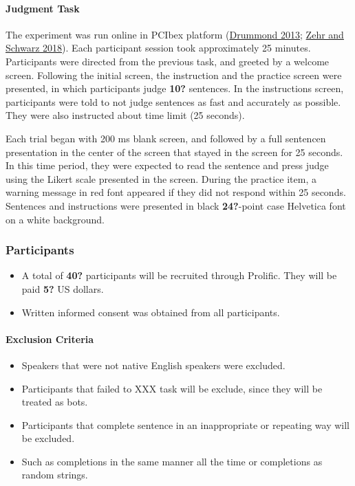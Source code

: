 \documentclass[
  10pt,
  letterpaper,
  DIV=11,
  numbers=noendperiod]{scrartcl}
\let\oldparagraph\paragraph
\renewcommand{\paragraph}[1]{\oldparagraph{#1}\mbox{}}
\providecommand{\tightlist}{%
  \setlength{\itemsep}{0pt}\setlength{\parskip}{0pt}}\usepackage{longtable,booktabs,array}
\begin{document}
\hypertarget{judgment-task-1}{%
\paragraph{Judgment Task}\label{judgment-task-1}}

The experiment was run online in PCIbex platform
(\protect\hyperlink{ref-Drummond2013}{Drummond 2013};
\protect\hyperlink{ref-ZehrSchwarz2018}{Zehr and Schwarz 2018}). Each
participant session took approximately 25 minutes. Participants were
directed from the previous task, and greeted by a welcome screen.
Following the initial screen, the instruction and the practice screen
were presented, in which participants judge \textbf{10?} sentences. In
the instructions screen, participants were told to not judge sentences
as fast and accurately as possible. They were also instructed about time
limit (25 seconds).

Each trial began with 200 ms blank screen, and followed by a full
sentencen presentation in the center of the screen that stayed in the
screen for 25 seconds. In this time period, they were expected to read
the sentence and press judge using the Likert scale presented in the
screen. During the practice item, a warning message in red font appeared
if they did not respond within 25 seconds. Sentences and instructions
were presented in black \textbf{24?}-point case Helvetica font on a
white background.

\hypertarget{participants}{%
\subsubsection{Participants}\label{participants}}

\begin{itemize}
\tightlist
\item
  A total of \textbf{40?} participants will be recruited through
  Prolific. They will be paid \textbf{5?} US dollars.
\item
  Written informed consent was obtained from all participants.
\end{itemize}

\hypertarget{exclusion-criteria}{%
\paragraph{Exclusion Criteria}\label{exclusion-criteria}}

\begin{itemize}
\tightlist
\item
  Speakers that were not native English speakers were excluded.
\item
  Participants that failed to XXX task will be exclude, since they will
  be treated as bots.
\item
  Participants that complete sentence in an inappropriate or repeating
  way will be excluded.
\item
  Such as completions in the same manner all the time or completions as
  random strings.
\end{itemize}
\end{document}
